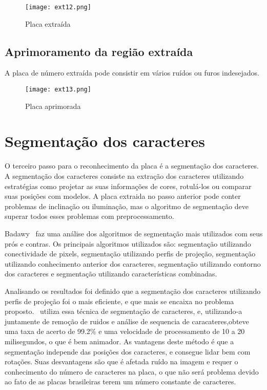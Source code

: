 \begin{figure}[H]
	\centering
	\texttt{[image: ext12.png]}
	\caption{Placa extraída}
	\label{fig:ext_true_number_plate}
\end{figure}

\subsection{Aprimoramento da região extraída}

A placa de número extraída pode consistir em vários ruídos ou furos indesejados.

\begin{figure}[H]
	\centering
	\texttt{[image: ext13.png]}
	\caption{Placa aprimorada}
	\label{fig:ext_enhanced_number_plate}
\end{figure}

\section{Segmentação dos caracteres}
\label{sec:segmentacao}

O terceiro passo para o reconhecimento da placa é a segmentação dos caracteres.
A segmentação dos caracteres consiste na extração dos caracteres utilizando
estratégias como projetar as suas informações de cores, rotulá-los ou comparar
suas posições com modelos. A placa extraida no passo anterior pode conter
problemas de inclinação ou iluminação, mas o algoritmo de segmentação deve
superar todos esses problemas com preprocessamento.~\cite{s2013automatic}

Badawy~\cite{s2013automatic} faz uma análise dos algoritmos de segmentação mais
utilizados com seus prós e contras.  Os principais algoritmos utilizados são:
segmentação utilizando conectividade de pixels, segmentação utilizando perfis de
projeção, segmentação utilizando conhecimento anterior dos caracteres,
segmentação utilizando contorno dos caracteres e segmentação utilizando
características combinadas.

Analisando os resultados foi definido que a segmentação dos caracteres
utilizando perfis de projeção foi o mais eficiente, e que mais se encaixa no
problema proposto.~\cite{sanyuan2004car} utiliza essa técnica de segmentação de
caracteres, e, utilizando-a juntamente de remoção de ruidos e análise de
sequencia de caracateres,obteve uma taxa de acerto de 99.2\% e uma velocidade de
processamento de 10 a 20 milisegundos, o que é bem animador. As vantagens deste
método é que a segmentação independe das posições dos caracteres, e consegue
lidar bem com rotações. Suas desvantagens são que é afetada ruído na imagem e
requer o conhecimento do número de caracteres na placa, o que não será problema
devido ao fato de as placas brasileiras terem um número constante de caracteres.

